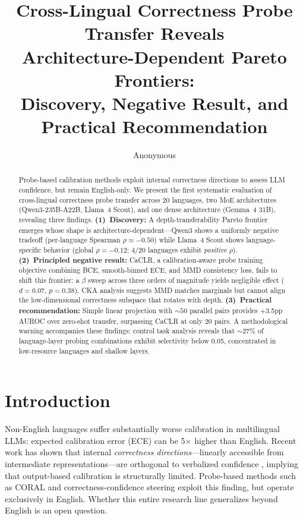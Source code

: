 \documentclass[11pt,a4paper]{article}
\title{Cross-Lingual Correctness Probe Transfer Reveals\\Architecture-Dependent Pareto Frontiers:\\Discovery, Negative Result, and Practical Recommendation}
\author{Anonymous}
\begin{document}
\maketitle

\begin{abstract}
Probe-based calibration methods exploit internal correctness directions to assess LLM confidence, but remain English-only.
We present the first systematic evaluation of cross-lingual correctness probe transfer across 20 languages, two MoE architectures (Qwen3-235B-A22B, Llama~4 Scout), and one dense architecture (Gemma~4 31B), revealing three findings.
\textbf{(1)~Discovery:} A depth-transferability Pareto frontier emerges whose shape is architecture-dependent---Qwen3 shows a uniformly negative tradeoff (per-language Spearman $\rho \approx -0.50$) while Llama~4 Scout shows language-specific behavior (global $\rho = -0.12$; 4/20 languages exhibit \emph{positive} $\rho$).
\textbf{(2)~Principled negative result:} CaCLR, a calibration-aware probe training objective combining BCE, smooth-binned ECE, and MMD consistency loss, fails to shift this frontier: a $\beta$ sweep across three orders of magnitude yields negligible effect ($d = 0.07$, $p = 0.38$). CKA analysis suggests MMD matches marginals but cannot align the low-dimensional correctness subspace that rotates with depth.
\textbf{(3)~Practical recommendation:} Simple linear projection with ${\sim}50$ parallel pairs provides +3.5pp AUROC over zero-shot transfer, surpassing CaCLR at only 20 pairs.
A methodological warning accompanies these findings: control task analysis reveals that ${\sim}27\%$ of language-layer probing combinations exhibit selectivity below 0.05, concentrated in low-resource languages and shallow layers.
\end{abstract}

\section{Introduction}

Non-English languages suffer substantially worse calibration in multilingual LLMs: expected calibration error (ECE) can be 5$\times$ higher than English.
Recent work has shown that internal \emph{correctness directions}---linearly accessible from intermediate representations---are orthogonal to verbalized confidence \cite{miao2026steering}, implying that output-based calibration is structurally limited.
Probe-based methods such as CORAL \cite{miao2026coral} and correctness-confidence steering \cite{miao2026steering} exploit this finding, but operate exclusively in English.
Whether this entire research line generalizes beyond English is an open question.
\end{document}
